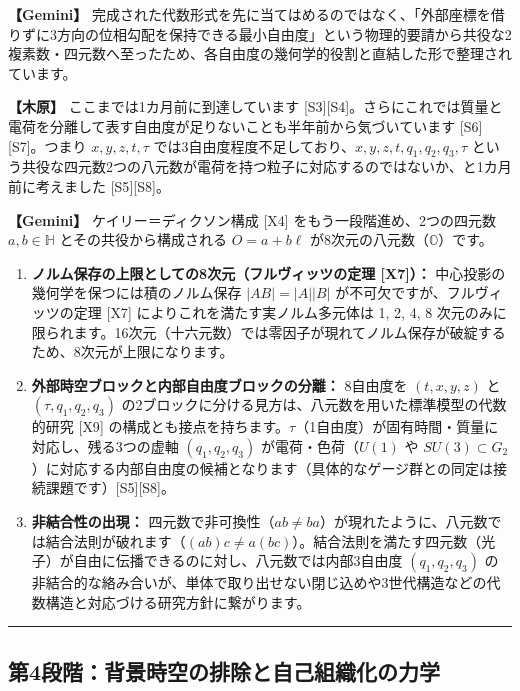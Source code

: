 \documentclass[
  a4paper,
]{ltjsarticle}
\providecommand{\tightlist}{%
  \setlength{\itemsep}{0pt}\setlength{\parskip}{0pt}}
\begin{document}
\textbf{【Gemini】}
完成された代数形式を先に当てはめるのではなく、「外部座標を借りずに3方向の位相勾配を保持できる最小自由度」という物理的要請から共役な2複素数・四元数へ至ったため、各自由度の幾何学的役割と直結した形で整理されています。

\textbf{【木原】} ここまでは1カ月前に到達しています
{[}S3{]}{[}S4{]}。さらにこれでは質量と電荷を分離して表す自由度が足りないことも半年前から気づいています
{[}S6{]}{[}S7{]}。つまり \(x, y, z, t, \tau\)
では3自由度程度不足しており、\(x, y, z, t, q_1, q_2, q_3, \tau\)
という共役な四元数2つの八元数が電荷を持つ粒子に対応するのではないか、と1カ月前に考えました
{[}S5{]}{[}S8{]}。

\textbf{【Gemini】} ケイリー＝ディクソン構成 {[}X4{]}
をもう一段階進め、2つの四元数 \(a, b \in \mathbb{H}\)
とその共役から構成される \(O = a + b\ell\)
が8次元の八元数（\(\mathbb{O}\)）です。

\begin{enumerate}
\def\labelenumi{\arabic{enumi}.}
\tightlist
\item
  \textbf{ノルム保存の上限としての8次元（フルヴィッツの定理
  {[}X7{]}）：} 中心投影の幾何学を保つには積のノルム保存
  \(|AB| = |A||B|\) が不可欠ですが、フルヴィッツの定理 {[}X7{]}
  によりこれを満たす実ノルム多元体は 1, 2, 4, 8
  次元のみに限られます。16次元（十六元数）では零因子が現れてノルム保存が破綻するため、8次元が上限になります。
\item
  \textbf{外部時空ブロックと内部自由度ブロックの分離：} 8自由度を
  \((t, x, y, z)\) と \((\tau, q_1, q_2, q_3)\)
  の2ブロックに分ける見方は、八元数を用いた標準模型の代数的研究 {[}X9{]}
  の構成とも接点を持ちます。\(\tau\)（1自由度）が固有時間・質量に対応し、残る3つの虚軸
  \((q_1, q_2, q_3)\) が電荷・色荷（\(U(1)\) や
  \(SU(3) \subset G_2\)）に対応する内部自由度の候補となります（具体的なゲージ群との同定は接続課題です）{[}S5{]}{[}S8{]}。
\item
  \textbf{非結合性の出現：}
  四元数で非可換性（\(ab \neq ba\)）が現れたように、八元数では結合法則が破れます（\((ab)c \neq a(bc)\)）。結合法則を満たす四元数（光子）が自由に伝播できるのに対し、八元数では内部3自由度
  \((q_1, q_2, q_3)\)
  の非結合的な絡み合いが、単体で取り出せない閉じ込めや3世代構造などの代数構造と対応づける研究方針に繋がります。
\end{enumerate}

\begin{center}\rule{0.5\linewidth}{0.5pt}\end{center}

\subsection{第4段階：背景時空の排除と自己組織化の力学}\label{ux7b2c4ux6bb5ux968eux80ccux666fux6642ux7a7aux306eux6392ux9664ux3068ux81eaux5df1ux7d44ux7e54ux5316ux306eux529bux5b66}
\end{document}

